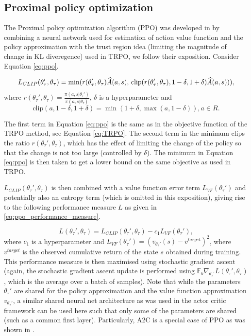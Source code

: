 \newpage
\subsection{Proximal policy optimization}
The Proximal policy optimization algorithm (PPO) was developed in \cite{proximal_policy_optimization} by combining a neural network used for estimation of action value function and the policy approximation with the trust region idea (limiting the magnitude of change in KL diveregence) used in TRPO, we follow their exposition. Consider Equation \ref{eq:ppo}.

\begin{equation}
\label{eq:ppo}
\footnotesize	
 L_{CLIP}(\theta_{\tau}', \theta_{\tau}) = \min(r(\theta_{\tau}',\theta_{\tau})\widehat{A}(a, s), \, \mathrm{clip}(r(\theta_{\tau}',\theta_{\tau}), 1-\delta, 1+\delta)\widehat{A}(a, s))),
\end{equation}
where $r(\theta_{\tau}',\theta_{\tau}) = \frac{\pi(a, s|\theta_{\tau}')}{\pi(a, s|\theta_{\tau})}$, $\delta$ is a hyperparameter and 
\begin{equation*}
\mathrm{clip}(a, 1-\delta, 1+\delta) = \min(1+\delta, \max(a,1-\delta)), a \in R.
\end{equation*}

The first term in Equation \ref{eq:ppo} is the same as in the objective function of the TRPO method, see Equation \ref{eq:TRPO}. The second term in the minimum clips the ratio $r(\theta_{\tau}',\theta_{\tau})$, which  has the effect of limiting the change of the policy so that the change is not too large (controlled by $\delta$). The minimum in Equation \ref{eq:ppo} is then taken to get a lower bound on the same objective as used in TRPO.

$L_{CLIP}(\theta_{\tau}', \theta_{\tau})$ is then combined with a value function error term $L_{VF}(\theta_{\tau}')$ and potentially also an entropy term (which is omitted in this exposition), giving rise to the following performance measure $L$ as given in \ref{eq:ppo_performance_measure}.

\begin{equation}
\label{eq:ppo_performance_measure}
L(\theta_{\tau}', \theta_{\tau}) =  L_{CLIP}(\theta_{\tau}', \theta_{\tau}) - c_1 L_{VF}(\theta_{\tau}'),
\end{equation}
where $c_1$ is a hyperparameter and $L_{VF}(\theta_{\tau}')=(v_{\theta_{\tau}'}(s)-v^{target})^2$, where $v^{target}$ is the observed cumulative return of the state $s$ obtained during training. This performance measure is then maximised using stochastic gradient ascent (again, the stochastic gradient ascent update is performed using $\mathbb{E}_b \nabla_{\theta_{\tau}'} L(\theta_{\tau}', \theta_{\tau})$, which is the average over a batch of samples). Note that while the parameters $\theta_{\tau}'$ are shared for the policy approximation and the value function approximation $v_{\theta_{\tau}'}$, a similar shared neural net architecture as was used in the actor critic framework can be used here such that only some of the parameters are shared (such as a common first layer). Particularly, A2C is a special case of PPO as was shown in \cite{a2c_ppo_special_case}. 

